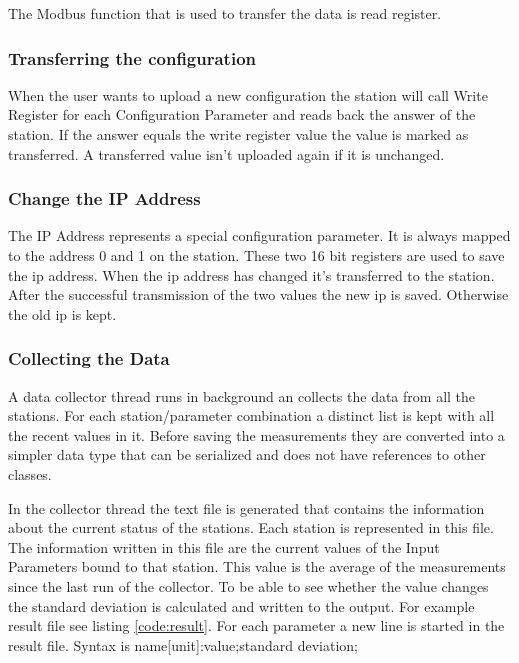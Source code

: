 The Modbus function that is used to transfer the data is read register.

\subsubsection{Transferring the configuration} %
\label{ssub:transferring_the_configuration}
When the user wants to upload a new configuration the station will call Write Register for each Configuration Parameter and reads back the answer of the station. If the answer equals the write register value the value is marked as transferred. A transferred value isn't uploaded again if it is unchanged.
\subsubsection{Change the IP Address} %
\label{ssub:change_the_ip_address}
The IP Address represents a special configuration parameter. It is always mapped to the address 0 and 1 on the station. These two 16 bit registers are used to save the ip address. When the ip address has changed it's transferred to the station. After the successful transmission of the two values the new ip is saved. Otherwise the old ip is kept.


\subsubsection{Collecting the Data} %
\label{ssub:collecting_the_data}
A data collector thread runs in background an collects the data from all the stations. For each station/parameter combination a distinct list is kept with all the recent values in it. Before saving the measurements they are converted into a simpler data type that can be serialized and does not have references to other classes.

In the collector thread the text file is generated that contains the information about the current status of the stations. Each station is represented in this file. The information written in this file are the current values of the Input Parameters bound to that station. This value is the average of the measurements since the last run of the collector. To be able to see whether the value changes the standard deviation is calculated and written to the output. For example result file see listing \ref{code:result}. 
For each parameter a new line is started in the result file. Syntax is {\C name[unit]:value;standard deviation;}

